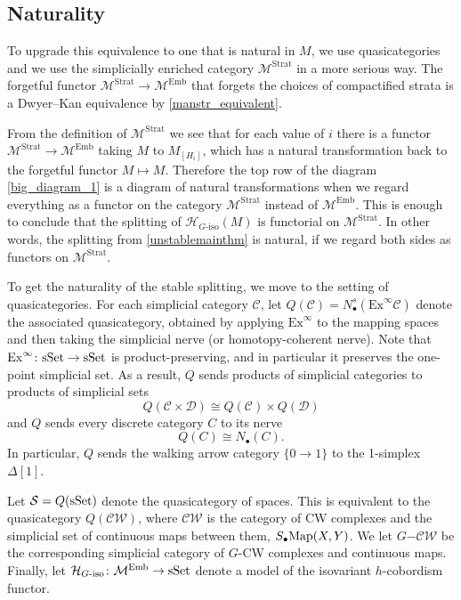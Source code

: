\documentclass[11pt]{amsart}
\theoremstyle{definition}
\numberwithin{equation}{section}
\numberwithin{figure}{section}
\newcommand{\Map}{\textup{Map}}
\newcommand{\mc}{\mathcal}
\newcommand{\sSet}{\textup{sSet}}
\newcommand{\Man}{\mc M^\mathrm{Emb}}
\newcommand{\Manstr}{\mc M^\mathrm{Strat}}
\newcommand{\Ex}{\mathrm{Ex}}
\newcommand{\dashiso}{\textrm{-}\mathrm{iso}}
\begin{document}




\subsection{Naturality}\label{sec:naturality}
To upgrade this equivalence to one that is natural in $M$, we use quasicategories and we use the simplicially enriched category $\Manstr$ in a more serious way. The forgetful functor $\Manstr \to \Man$ that forgets the choices of compactified strata is a Dwyer--Kan equivalence by \autoref{manstr_equivalent}. %

From the definition of $\Manstr$ we see that for each value of $i$ there is a functor $\Manstr \to \Man$ taking $M$ to $M_{[H_i]}$, which has a natural transformation back to the forgetful functor $M \mapsto M$. Therefore the top row of the diagram \eqref{big_diagram_1} is a diagram of natural transformations when we regard everything as a functor on the category $\Manstr$ instead of $\Man$. This is enough to conclude that the splitting of $\mc H_{G\dashiso}(M)$ is functorial on $\Manstr$. In other words, the splitting from \autoref{unstablemainthm} is natural, if we regard both sides as functors on $\Manstr$.

To get the naturality of the stable splitting, we move to the setting of quasicategories. For each simplicial category $\mc C$, let $Q(\mc C) = N^s_\bullet(\Ex^\infty \mc C)$ denote the associated quasicategory, obtained by applying $\Ex^\infty$ to the mapping spaces and then taking the simplicial nerve (or homotopy-coherent nerve). Note that $\Ex^\infty\colon \sSet \to \sSet$ is product-preserving, and in particular it preserves the one-point simplicial set. As a result, $Q$ sends products of simplicial categories to products of simplicial sets
\[ Q(\mc C \times \mc D) \cong Q(\mc C) \times Q(\mc D) \]
and $Q$ sends every discrete category $C$ to its nerve
\[ Q(C) \cong N_\bullet(C). \]
In particular, $Q$ sends the walking arrow category $\{0 \to 1\}$ to the 1-simplex $\Delta[1]$.

Let $\mc S = Q(\sSet)$ denote the quasicategory of spaces. This is equivalent to the quasicategory $Q(\mc{CW})$, where $\mc{CW}$ is the category of CW complexes and the simplicial set of continuous maps between them, $S_\bullet\Map(X,Y)$. We let $G\mc{-CW}$ be the corresponding simplicial category of $G$-CW complexes and continuous maps. Finally, let $\mc H_{G\dashiso}\colon \Man \to \sSet$ denote a model of the isovariant $h$-cobordism functor.
\end{document}
